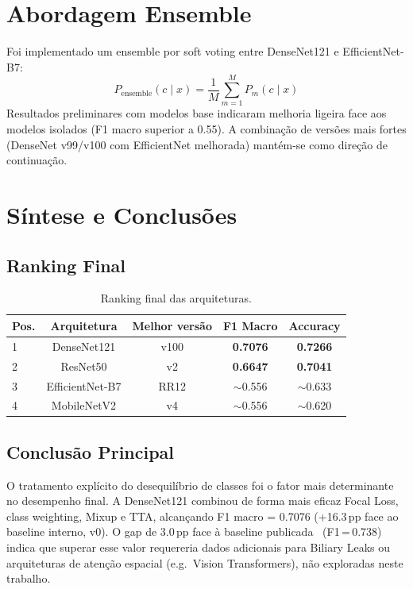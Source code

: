 \documentclass[runningheads]{llncs}
\begin{document}
\section{Abordagem Ensemble}
Foi implementado um ensemble por soft voting entre DenseNet121 e
EfficientNet-B7:
\begin{equation}
P_{\text{ensemble}}(c\mid x) = \frac{1}{M}\sum_{m=1}^{M} P_m(c\mid x)
\end{equation}
Resultados preliminares com modelos base indicaram melhoria ligeira face aos
modelos isolados (F1 macro superior a 0.55). A combinação de versões mais
fortes (DenseNet v99/v100 com EfficientNet melhorada) mantém-se como direção de
continuação.

\section{Síntese e Conclusões}

\subsection{Ranking Final}
\begin{table}[ht]
\caption{Ranking final das arquiteturas.}
\label{tab:ranking}
\centering
\begin{tabular}{lcccc}
\hline
Pos. & Arquitetura & Melhor versão & F1 Macro & Accuracy \\
\hline
1 & DenseNet121 & v100 & \textbf{0.7076} & \textbf{0.7266} \\
2 & ResNet50 & v2 & \textbf{0.6647} & \textbf{0.7041} \\
3 & EfficientNet-B7 & RR12 & \(\sim\)0.556 & \(\sim\)0.633 \\
4 & MobileNetV2 & v4 & \(\sim\)0.556 & \(\sim\)0.620 \\
\hline
\end{tabular}
\end{table}

\subsection{Conclusão Principal}
O tratamento explícito do desequilíbrio de classes foi o fator mais
determinante no desempenho final. A DenseNet121 combinou de forma mais eficaz
Focal Loss, class weighting, Mixup e TTA, alcançando F1 macro = 0.7076
(+16.3\,pp face ao baseline interno, v0). O gap de 3.0\,pp face à baseline
publicada~\cite{martins2025} (F1\,=\,0.738) indica que superar esse valor
requereria dados adicionais para Biliary Leaks ou arquiteturas de
atenção espacial (e.g.\ Vision Transformers), não exploradas neste trabalho.
\end{document}
